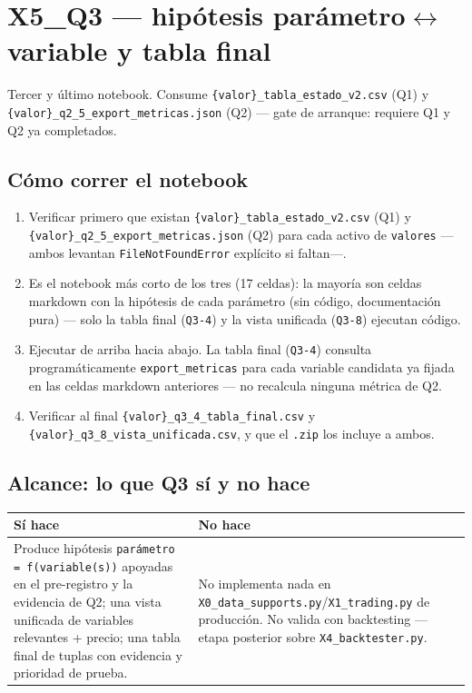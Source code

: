 \documentclass[11pt,a4paper]{article}
\newcommand{\code}[1]{\texttt{\small #1}}
\begin{document}
\newpage
\section{X5\_Q3 — hipótesis parámetro$\leftrightarrow$variable y tabla final}
\label{sec:q3}

Tercer y último notebook. Consume \code{\{valor\}\_tabla\_estado\_v2.csv} (Q1) y
\code{\{valor\}\_q2\_5\_export\_metricas.json} (Q2) — gate de arranque: requiere Q1 y Q2 ya
completados.

\subsection{Cómo correr el notebook}

\begin{enumerate}[leftmargin=1.4em,itemsep=2pt]
\item Verificar primero que existan \code{\{valor\}\_tabla\_estado\_v2.csv} (Q1) y
  \code{\{valor\}\_q2\_5\_export\_metricas.json} (Q2) para cada activo de \code{valores}
  —ambos levantan \code{FileNotFoundError} explícito si faltan—.
\item Es el notebook más corto de los tres (17 celdas): la mayoría son celdas markdown
  con la hipótesis de cada parámetro (sin código, documentación pura) — solo la tabla
  final (\code{Q3-4}) y la vista unificada (\code{Q3-8}) ejecutan código.
\item Ejecutar de arriba hacia abajo. La tabla final (\code{Q3-4}) consulta
  programáticamente \code{export\_metricas} para cada variable candidata ya fijada en las
  celdas markdown anteriores — no recalcula ninguna métrica de Q2.
\item Verificar al final \code{\{valor\}\_q3\_4\_tabla\_final.csv} y
  \code{\{valor\}\_q3\_8\_vista\_unificada.csv}, y que el \code{.zip} los incluye a ambos.
\end{enumerate}

\subsection{Alcance: lo que Q3 sí y no hace}

\begin{table}[h]
\centering
\small
\begin{tabularx}{\linewidth}{@{}X X@{}}
\toprule
\textbf{Sí hace} & \textbf{No hace} \\
\midrule
Produce hipótesis \code{parámetro = f(variable(s))} apoyadas en el pre-registro y la
evidencia de Q2; una vista unificada de variables relevantes + precio; una tabla final de
tuplas con evidencia y prioridad de prueba. &
No implementa nada en \code{X0\_data\_supports.py}/\code{X1\_trading.py} de producción. No
valida con backtesting — etapa posterior sobre \code{X4\_backtester.py}. \\
\bottomrule
\end{tabularx}
\end{table}
\end{document}

